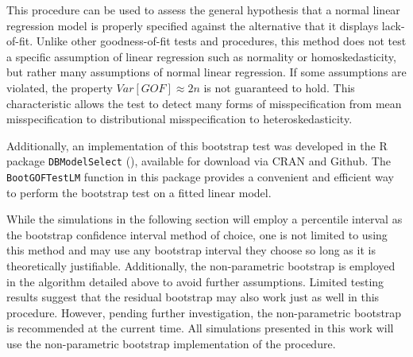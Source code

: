 \documentclass[12pt]{article} %
\theoremstyle{definition}
\begin{document}
		This procedure can be used to assess the general hypothesis that a normal linear regression model is properly specified against the alternative that it displays lack-of-fit.
		Unlike other goodness-of-fit tests and procedures, this method does not test a specific assumption of linear regression such as normality or homoskedasticity, but rather
		many assumptions of normal linear regression. If some assumptions are violated, the property $Var[GOF] \approx 2n$ is not guaranteed to hold. This characteristic allows the test to detect
		many forms of misspecification from mean misspecification to distributional misspecification to heteroskedasticity. 

		Additionally, an implementation of this bootstrap test was developed in the R package \verb|DBModelSelect| (\cite{Koeneman}), available for download via CRAN and Github.
		The \verb|BootGOFTestLM| function in this package provides a convenient and efficient way to perform the bootstrap test on a fitted linear model.
		
		While the simulations in the following section will employ a percentile interval as the bootstrap confidence interval method of choice, one is not limited to using this method
		and may use any bootstrap interval they choose so long as it is theoretically justifiable. Additionally, the non-parametric bootstrap is employed in the algorithm detailed above to avoid further
		assumptions. Limited testing results suggest that the residual bootstrap may also work just as well in this procedure. However, pending further investigation, the non-parametric
		bootstrap is recommended at the current time. All simulations presented in this work will use the non-parametric bootstrap implementation of the procedure.



\end{document}
